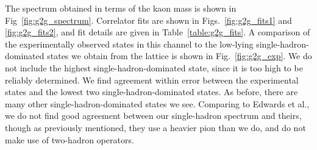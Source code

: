 The spectrum obtained in terms of the kaon mass is shown in Fig~\ref{fig:g2g_spectrum}. Correlator fits are shown in Figs.~\ref{fig:g2g_fits1} and \ref{fig:g2g_fits2}, and fit details are given in Table~\ref{table:g2g_fits}. A comparison of the experimentally observed states in this channel to the low-lying single-hadron-dominated states we obtain from the lattice is shown in Fig.~\ref{fig:g2g_exp}. We do not include the highest single-hadron-dominated state, since it is too high to be reliably determined. We find agreement within error between the experimental states and the lowest two single-hadron-dominated states. As before, there are many other single-hadron-dominated states we see. Comparing to Edwards et al., we do not find good agreement between our single-hadron spectrum and theirs, though as previously mentioned, they use a heavier pion than we do, and do not make use of two-hadron operators.
